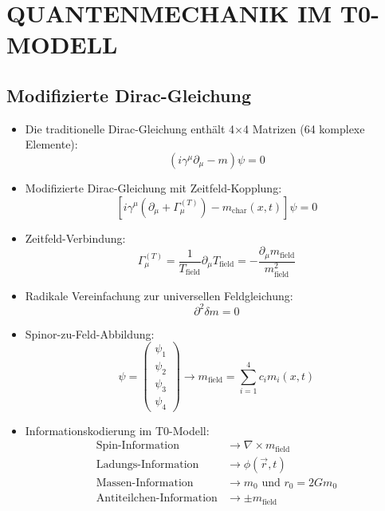 \documentclass[12pt,a4paper]{article}
\begin{document}
	\section{QUANTENMECHANIK IM T0-MODELL}
	
	\subsection{Modifizierte Dirac-Gleichung}
	\begin{itemize}
		\item Die traditionelle Dirac-Gleichung enthält 4×4 Matrizen (64 komplexe Elemente):
		\begin{equation}
			\left(i\gamma^\mu \partial_\mu - m\right) \psi = 0
		\end{equation}
		
		\item Modifizierte Dirac-Gleichung mit Zeitfeld-Kopplung:
		\begin{equation}
			\boxed{\left[i\gamma^\mu\left(\partial_\mu + \Gamma_\mu^{(T)}\right) - m_{\text{char}}(x,t)\right]\psi = 0}
		\end{equation}
		
		\item Zeitfeld-Verbindung:
		\begin{equation}
			\Gamma_\mu^{(T)} = \frac{1}{T_{\text{field}}} \partial_\mu T_{\text{field}} = -\frac{\partial_\mu m_{\text{field}}}{m_{\text{field}}^2}
		\end{equation}
		
		\item Radikale Vereinfachung zur universellen Feldgleichung:
		\begin{equation}
			\boxed{\partial^2 \delta m = 0}
		\end{equation}
		
		\item Spinor-zu-Feld-Abbildung:
		\begin{equation}
			\psi = \begin{pmatrix} \psi_1 \\ \psi_2 \\ \psi_3 \\ \psi_4 \end{pmatrix} \rightarrow m_{\text{field}} = \sum_{i=1}^4 c_i m_i(x,t)
		\end{equation}
		
		\item Informationskodierung im T0-Modell:
		\begin{align}
			\text{Spin-Information} &\rightarrow \nabla \times m_{\text{field}} \\
			\text{Ladungs-Information} &\rightarrow \phi(\vec{r}, t) \\
			\text{Massen-Information} &\rightarrow m_0 \text{ und } r_0 = 2Gm_0 \\
			\text{Antiteilchen-Information} &\rightarrow \pm m_{\text{field}}
		\end{align}
	\end{itemize}
	
\end{document}
